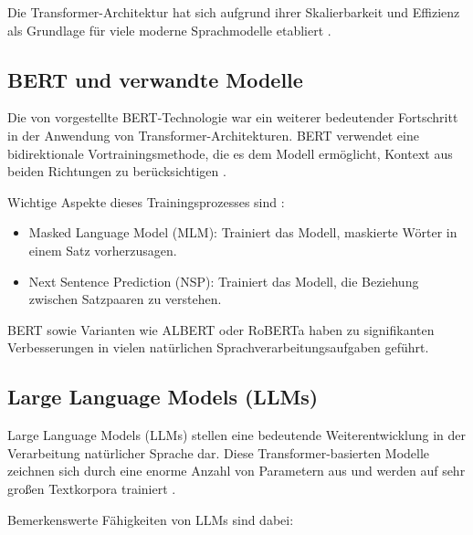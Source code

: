 Die Transformer-Architektur hat sich aufgrund ihrer Skalierbarkeit und Effizienz als Grundlage für viele moderne Sprachmodelle etabliert \cite{VaswaniAshish2023AIAY}.

\subsection{BERT und verwandte Modelle}
\label{subsec:bert-und-verwandte-modelle}

Die von \textcite{DevlinJacob2019BPoD} vorgestellte \gls{BERT}-Technologie war ein weiterer bedeutender Fortschritt in der Anwendung von Transformer-Architekturen. BERT verwendet eine bidirektionale Vortrainingsmethode, die es dem Modell ermöglicht, Kontext aus beiden Richtungen zu berücksichtigen \cite{DevlinJacob2019BPoD}.

Wichtige Aspekte dieses Trainingsprozesses sind \cite{DevlinJacob2019BPoD}:
\begin{itemize}
	\item Masked Language Model (MLM): Trainiert das Modell, maskierte Wörter in einem Satz vorherzusagen.
	\item Next Sentence Prediction (NSP): Trainiert das Modell, die Beziehung zwischen Satzpaaren zu verstehen.
\end{itemize}
 \gls{BERT}\cite{DevlinJacob2019BPoD} sowie Varianten wie ALBERT\cite{LanZhenzhong2019AALB} oder RoBERTa\cite{liu2019robertarobustlyoptimizedbert} haben zu signifikanten Verbesserungen in vielen natürlichen Sprachverarbeitungsaufgaben geführt.

\subsection{Large Language Models (LLMs)}
\label{subsec:llms}
Large Language Models (LLMs) stellen eine bedeutende Weiterentwicklung in der Verarbeitung natürlicher Sprache dar. Diese Transformer-basierten Modelle zeichnen sich durch eine enorme Anzahl von Parametern aus und werden auf sehr großen Textkorpora trainiert \cite{VaswaniAshish2023AIAY}.

Bemerkenswerte Fähigkeiten von \glspl{LLM} sind dabei:


